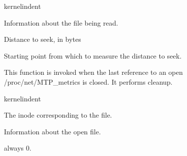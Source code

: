 \documentclass[letterpaper,10pt,english]{sphinxmanual}
\begin{document}
\begin{sphinxuseclass}{kernelindent}
\sphinxAtStartPar
{}
\begin{description}
\sphinxAtStartPar
Information about the file being read.

\sphinxAtStartPar
Distance to seek, in bytes

\sphinxAtStartPar
Starting point from which to measure the distance to seek.

\end{description}

\end{sphinxuseclass}

\begin{fulllineitems}
\label{\detokenize{mtpimpl.c:c.MTP_metrics_release}}
\pysigstartsignatures
\pysigstartmultiline
{}
\pysigstopmultiline
\pysigstopsignatures
\sphinxAtStartPar
This function is invoked when the last reference to an open /proc/net/MTP\_metrics is closed. It performs cleanup.

\end{fulllineitems}


\begin{sphinxuseclass}{kernelindent}
\sphinxAtStartPar
{}
\begin{description}
\sphinxAtStartPar
The inode corresponding to the file.

\sphinxAtStartPar
Information about the open file.

\end{description}

\sphinxAtStartPar
{}

\sphinxAtStartPar
always 0.

\end{sphinxuseclass}
\end{document}
